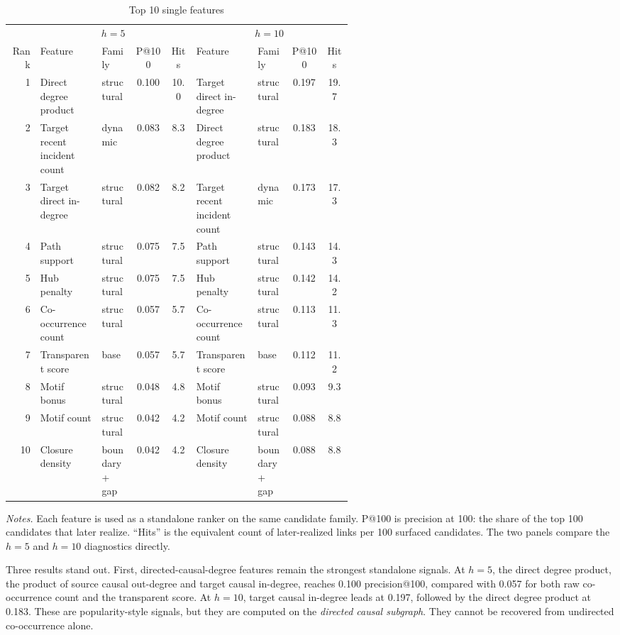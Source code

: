 \documentclass[11pt]{article}
\newcommand{\fignotes}[1]{\caption*{\textit{Notes.} #1}}
\begin{document}
\begin{table}[h]
  \caption{Top 10 single features}
  \label{tab:single-feature-top10}
  \centering
  \small
  \begin{tabular}{rL{0.18\linewidth}L{0.10\linewidth}ccL{0.18\linewidth}L{0.10\linewidth}cc}
    \toprule
    &  &  \\
    Rank & Feature & Family & P@100 & Hits & Feature & Family & P@100 & Hits \\
     & Direct degree product & structural & 0.100 & 10.0 & Target direct in-degree & structural & 0.197 & 19.7 \\
    2 & Target recent incident count & dynamic & 0.083 & 8.3 & Direct degree product & structural & 0.183 & 18.3 \\
    3 & Target direct in-degree & structural & 0.082 & 8.2 & Target recent incident count & dynamic & 0.173 & 17.3 \\
    4 & Path support & structural & 0.075 & 7.5 & Path support & structural & 0.143 & 14.3 \\
    5 & Hub penalty & structural & 0.075 & 7.5 & Hub penalty & structural & 0.142 & 14.2 \\
    6 & Co-occurrence count & structural & 0.057 & 5.7 & Co-occurrence count & structural & 0.113 & 11.3 \\
    7 & Transparent score & base & 0.057 & 5.7 & Transparent score & base & 0.112 & 11.2 \\
	    8 & Motif bonus & structural & 0.048 & 4.8 & Motif bonus & structural & 0.093 & 9.3 \\
	    9 & Motif count & structural & 0.042 & 4.2 & Motif count & structural & 0.088 & 8.8 \\
	   10 & Closure density & boundary + gap & 0.042 & 4.2 & Closure density & boundary + gap & 0.088 & 8.8 \\
    \bottomrule
  \end{tabular}
  \fignotes{Each feature is used as a standalone ranker on the same candidate family. P@100 is precision at 100: the share of the top 100 candidates that later realize. ``Hits'' is the equivalent count of later-realized links per 100 surfaced candidates. The two panels compare the \(h=5\) and \(h=10\) diagnostics directly.}
\end{table}

Three results stand out. First, directed-causal-degree features remain the strongest standalone signals. At \(h=5\), the direct degree product, the product of source causal out-degree and target causal in-degree, reaches 0.100 precision@100, compared with 0.057 for both raw co-occurrence count and the transparent score. At \(h=10\), target causal in-degree leads at 0.197, followed by the direct degree product at 0.183. These are popularity-style signals, but they are computed on the \emph{directed causal subgraph}. They cannot be recovered from undirected co-occurrence alone.
\end{document}
